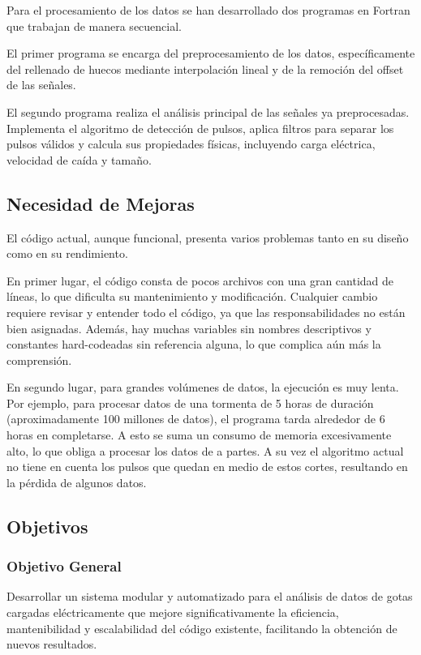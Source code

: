 \documentclass[12pt,a4paper]{article}
\begin{document}
Para el procesamiento de los datos se han desarrollado dos programas en Fortran que trabajan de manera secuencial.

El primer programa se encarga del preprocesamiento de los datos, específicamente del rellenado de huecos mediante interpolación lineal y de la remoción del offset de las señales.

El segundo programa realiza el análisis principal de las señales ya preprocesadas. Implementa el algoritmo de detección de pulsos, aplica filtros para separar los pulsos válidos y calcula sus propiedades físicas, incluyendo carga eléctrica, velocidad de caída y tamaño.

\subsection{Necesidad de Mejoras}
\lhead{}

El código actual, aunque funcional, presenta varios problemas tanto en su diseño como en su rendimiento.

En primer lugar, el código consta de pocos archivos con una gran cantidad de líneas, lo que dificulta su mantenimiento y modificación. Cualquier cambio requiere revisar y entender todo el código, ya que las responsabilidades no están bien asignadas. Además, hay muchas variables sin nombres descriptivos y constantes hard-codeadas sin referencia alguna, lo que complica aún más la comprensión.

En segundo lugar, para grandes volúmenes de datos, la ejecución es muy lenta. Por ejemplo, para procesar datos de una tormenta de 5 horas de duración (aproximadamente 100 millones de datos), el programa tarda alrededor de 6 horas en completarse. A esto se suma un consumo de memoria excesivamente alto, lo que obliga a procesar los datos de a partes. A su vez el algoritmo actual no tiene en cuenta los pulsos que quedan en medio de estos cortes, resultando en la pérdida de algunos datos.

\subsection{Objetivos}
\lhead{}

\subsubsection{Objetivo General}

Desarrollar un sistema modular y automatizado para el análisis de datos de gotas cargadas eléctricamente que mejore significativamente la eficiencia, mantenibilidad y escalabilidad del código existente, facilitando la obtención de nuevos resultados.
\end{document}
